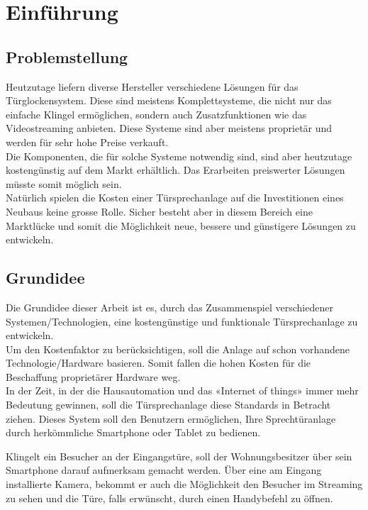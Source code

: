 \section{Einführung}
\label{sec:chapterexample}

\subsection{Problemstellung}
\label{sec:chapterexample}

Heutzutage liefern diverse Hersteller verschiedene Lösungen für das Türglockensystem. Diese sind meistens Komplettsysteme, die nicht nur das einfache Klingel ermöglichen, sondern auch Zusatzfunktionen wie das Videostreaming anbieten. Diese Systeme sind aber meistens proprietär und werden für sehr hohe Preise verkauft.
\\
Die Komponenten, die für solche Systeme notwendig sind, sind aber heutzutage kostengünstig auf dem Markt erhältlich. Das Erarbeiten preiswerter Lösungen müsste somit möglich sein. 
\\
Natürlich spielen die Kosten einer Türsprechanlage auf die Investitionen eines Neubaus keine grosse Rolle. Sicher besteht aber in diesem Bereich eine Marktlücke und somit die Möglichkeit neue, bessere und günstigere Lösungen zu entwickeln.  

\subsection{Grundidee}
\label{sec:chapterexample}

Die Grundidee dieser Arbeit ist es, durch das Zusammenspiel verschiedener Systemen/Technologien, eine kostengünstige und funktionale Türsprechanlage zu entwickeln.
\\ 
Um den Kostenfaktor zu berücksichtigen, soll die Anlage auf schon vorhandene Technologie/Hardware basieren. Somit fallen die hohen Kosten für die Beschaffung proprietärer Hardware weg.
\\
In der Zeit, in der die Hausautomation und das «Internet of things» immer mehr Bedeutung gewinnen, soll die Türsprechanlage diese Standards in Betracht ziehen.  
Dieses System soll den Benutzern ermöglichen, Ihre Sprechtüranlage durch herkömmliche Smartphone oder Tablet zu bedienen.
 
Klingelt ein Besucher an der Eingangstüre, soll der Wohnungsbesitzer über sein Smartphone darauf aufmerksam gemacht werden. Über eine am Eingang installierte Kamera, bekommt er auch die Möglichkeit den Besucher im Streaming zu sehen und die Türe, falls erwünscht, durch einen Handybefehl zu öffnen. 